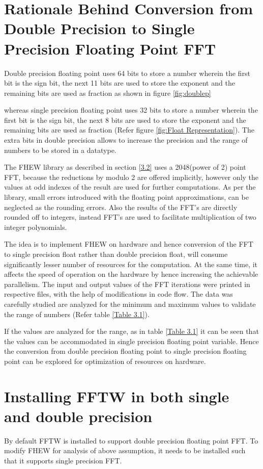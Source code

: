 \section{Rationale Behind Conversion from Double Precision to Single Precision Floating Point FFT}
Double precision floating point uses 64 bits to store a number wherein the first bit is the sign bit, the next 11 bits are used to store the exponent and the remaining bits are used as fraction as shown in figure \ref{fig:doublep} 


\noindent whereas single precision floating point uses 32 bits to store a number wherein the first bit is the sign bit, the next 8 bits are used to store the exponent and the remaining bits are used as fraction (Refer figure \ref{fig:Float Representation}). The extra bits in double precision allows to increase the precision and the range of numbers to be stored in a datatype. 

\noindent The FHEW library as described in section {\ref{3.2}} uses a 2048(power of 2) point FFT, because the reductions by modulo 2 are offered implicitly, however only the values at odd indexes of the result are used for further computations. As per the library, small errors introduced with the floating point approximations, can be neglected as the rounding errors. Also the results of the FFT's are directly rounded off to integers, instead FFT's are used to facilitate multiplication of two integer polynomials. 

\noindent The idea is to implement FHEW on hardware and hence conversion of the FFT to single precision float rather than double precision float, will consume significantly lesser number of resources for the computation. At the same time, it affects the speed of operation on the hardware by hence increasing the achievable parallelism. The input and output values of the FFT iterations were printed in respective files, with the help of modifications in code flow. The data was carefully studied are analyzed for the minimum and maximum values to validate the range of numbers (Refer table \ref{Table 3.1}).


If the values are analyzed for the range, as in table \ref{Table 3.1} it can be seen that the values can be accommodated in single precision floating point variable. Hence the conversion from double precision floating point to single precision floating point can be explored for optimization of resources on hardware. 
\section{Installing FFTW in both single and double precision}
By default FFTW is installed to support double precision floating point FFT. To modify FHEW for analysis of above assumption, it needs to be installed such that it supports single precision FFT.

